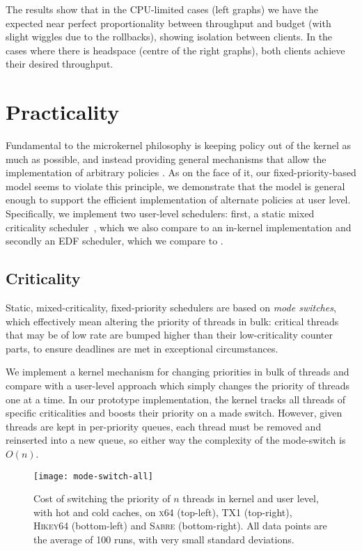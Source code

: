The results show that in the CPU-limited cases (left graphs)
we have the expected near perfect proportionality between throughput and
budget (with slight wiggles due to the rollbacks), showing isolation between clients. In the cases where there is headspace (centre of the right
graphs), both clients achieve their desired throughput.

\section{Practicality}

Fundamental to the microkernel philosophy is keeping policy out of the
kernel as much as possible, and instead providing general mechanisms
that allow the implementation of arbitrary policies
\citep{Heiser_Elphinstone_16}.  As on the face of it, our
fixed-priority-based model seems to violate this principle,  we
demonstrate that the model is general enough to support the efficient
implementation of alternate policies at user level. Specifically, we
implement two user-level schedulers: first, a static mixed criticality
scheduler~\citep{Baruah_BD_11}, which we also compare to an in-kernel
implementation and secondly an \gls{EDF} scheduler, which we compare to \litmus.

\subsection{Criticality}

Static, mixed-criticality, fixed-priority schedulers are based on \emph{mode
switches}, which effectively mean altering the priority of threads in bulk:
critical threads that may be of low rate are bumped higher than their
low-criticality counter parts, to ensure deadlines are met in exceptional
circumstances. 

We implement a kernel mechanism for changing priorities in bulk of threads 
and compare with a user-level approach which simply changes the priority of threads
one at a time. In our prototype implementation, the kernel tracks all threads of specific criticalities and boosts their priority on a made switch. However, given threads are kept in per-priority queues, each thread must be removed and reinserted into a new queue, so either way the complexity of the mode-switch is $O(n)$. 

\begin{figure}
  \centering
  \texttt{[image: mode-switch-all]}
  \caption[Kernel vs. user-level criticality switch.]{Cost of switching the priority of $n$ threads in kernel and user level, with hot
      and cold caches, on \textsc{x64} (top-left), \textsc{TX1} (top-right), \textsc{Hikey64}
      (bottom-left) and \textsc{Sabre} (bottom-right). All data points are the average of 100 runs,
                  with very small standard deviations.}
  \label{f:mode-switch}
\end{figure}

